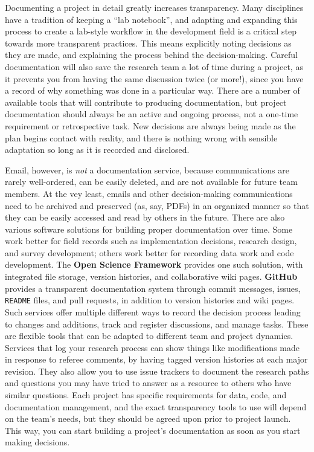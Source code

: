 Documenting a project in detail greatly increases transparency.
Many disciplines have a tradition of keeping a ``lab notebook'',
and adapting and expanding this process to create a
lab-style workflow in the development field is a
critical step towards more transparent practices.
This means explicitly noting decisions as they are made,
and explaining the process behind the decision-making.
Careful documentation will also save the research team a lot of time during a project,
as it prevents you from having the same discussion twice (or more!),
since you have a record of why something was done in a particular way.
There are a number of available tools
that will contribute to producing documentation,
but project documentation should always be an active and ongoing process,
not a one-time requirement or retrospective task.
New decisions are always being made as the plan begins contact with reality,
and there is nothing wrong with sensible adaptation so long as it is recorded and disclosed.

Email, however, is \textit{not} a documentation service, because communications are rarely well-ordered,
can be easily deleted, and are not available for future team members.
At the vey least, emails and other decision-making communications
need to be archived and preserved (as, say, PDFs)
in an organized manner so that they can be easily accessed and read by others in the future.
There are also various software solutions for building proper documentation over time.
Some work better for field records such as implementation decisions,
research design, and survey development;
others work better for recording data work and code development.
The \textbf{Open Science Framework} provides one such solution,
with integrated file storage, version histories, and collaborative wiki pages.
\textbf{GitHub} provides a transparent documentation system
through commit messages, issues, \texttt{README} files, and pull requests,
in addition to version histories and wiki pages.
Such services offer multiple different ways
to record the decision process leading to changes and additions,
track and register discussions, and manage tasks.
These are flexible tools that can be adapted to different team and project dynamics.
Services that log your research process can show things like modifications made in response to referee comments,
by having tagged version histories at each major revision.
They also allow you to use issue trackers
to document the research paths and questions you may have tried to answer
as a resource to others who have similar questions.
Each project has specific requirements for data, code, and documentation management,
and the exact transparency tools to use will depend on the team's needs,
but they should be agreed upon prior to project launch.
This way, you can start building a project's documentation as soon as you start making decisions.

